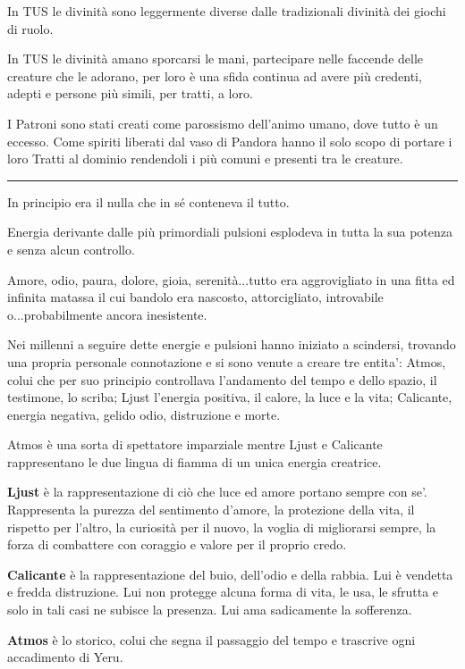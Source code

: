 \documentclass[a4paper,11pt,twoside,openany]{book}
\begin{document}
In TUS le divinità sono leggermente diverse dalle tradizionali divinità dei giochi di ruolo.

In TUS le divinità amano sporcarsi le mani, partecipare nelle faccende delle creature che le adorano, per loro è una sfida continua ad avere più credenti, adepti e persone più simili, per tratti, a loro.

I Patroni sono stati creati come parossismo dell'animo umano, dove tutto è un eccesso. Come spiriti liberati dal vaso di Pandora hanno il solo scopo di portare i loro Tratti al dominio rendendoli i più comuni e presenti tra le creature.

\noindent\rule{\textwidth}{1pt}

\bigskip

In principio era il nulla che in sé conteneva il tutto.

Energia derivante dalle più primordiali pulsioni esplodeva in tutta la sua potenza e senza alcun controllo.

Amore, odio, paura, dolore, gioia, serenità...tutto era aggrovigliato in una fitta ed infinita matassa il cui bandolo era nascosto, attorcigliato, introvabile o...probabilmente ancora inesistente.

Nei millenni a seguire dette energie e pulsioni hanno iniziato a scindersi, trovando una propria personale connotazione e si sono venute a creare tre entita': Atmos, colui che per suo principio controllava l'andamento del tempo e dello spazio, il testimone, lo scriba; Ljust l'energia positiva, il calore, la luce e la vita; Calicante, energia negativa, gelido odio, distruzione e morte.

Atmos è una sorta di spettatore imparziale mentre Ljust e Calicante rappresentano le due lingua di fiamma di un unica energia creatrice.

\textbf{Ljust} è la rappresentazione di ciò che luce ed amore portano sempre con se'. Rappresenta la purezza del sentimento d'amore, la protezione della vita, il rispetto per l'altro, la curiosità per il nuovo, la voglia di migliorarsi sempre, la forza di combattere con coraggio e valore per il proprio credo.

\textbf{Calicante} è la rappresentazione del buio, dell'odio e della rabbia. Lui è vendetta e fredda distruzione. Lui non protegge alcuna forma di vita, le usa, le sfrutta e solo in tali casi ne subisce la presenza. Lui ama sadicamente la sofferenza.

\textbf{Atmos} è lo storico, colui che segna il passaggio del tempo e trascrive ogni accadimento di Yeru.
\end{document}
